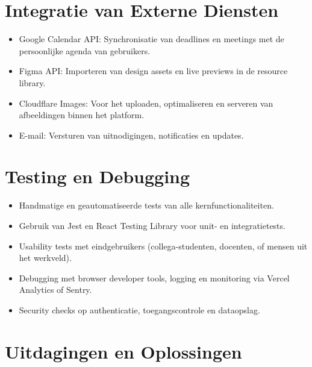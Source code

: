 \section{Integratie van Externe Diensten}
\label{sec:integraties}

\begin{itemize}
    \item Google Calendar API: Synchronisatie van deadlines en meetings met de persoonlijke agenda van gebruikers.
    \item Figma API: Importeren van design assets en live previews in de resource library.
    \item Cloudflare Images: Voor het uploaden, optimaliseren en serveren van afbeeldingen binnen het platform.
    \item E-mail: Versturen van uitnodigingen, notificaties en updates.
\end{itemize}

\section{Testing en Debugging}
\label{sec:testing-debugging}

\begin{itemize}
    \item Handmatige en geautomatiseerde tests van alle kernfunctionaliteiten.
    \item Gebruik van Jest en React Testing Library voor unit- en integratietests.
    \item Usability tests met eindgebruikers (collega-studenten, docenten, of mensen uit het werkveld).
    \item Debugging met browser developer tools, logging en monitoring via Vercel Analytics of Sentry.
    \item Security checks op authenticatie, toegangscontrole en dataopslag.
\end{itemize}

\section{Uitdagingen en Oplossingen}
\label{sec:uitdagingen}

